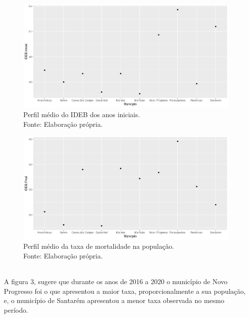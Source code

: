 \documentclass[a4paper, 10pt]{article}
\begin{document}
\begin{figure}[H]
	\centering 
	\includegraphics[scale=0.45]{IDEBINICIAL.png}
	\caption{\centering Perfil médio do IDEB dos anos iniciais. \\ Fonte: Elaboração própria.}
	\label{}
	\end{figure}

\begin{figure}[H]
	\centering 
	\includegraphics[scale=0.45]{IDEBFINAL.png}
	\caption{\centering Perfil médio da taxa de mortalidade na população. \\ Fonte: Elaboração própria.}
	\label{}
	\end{figure}
\\

A figura 3, sugere que durante os anos de 2016 a 2020 o município de Novo Progresso foi o que apresentou a maior taxa, proporcionalmente a sua população, e, o município de Santarém apresentou a menor taxa observada no mesmo período.

\\
\end{document}
